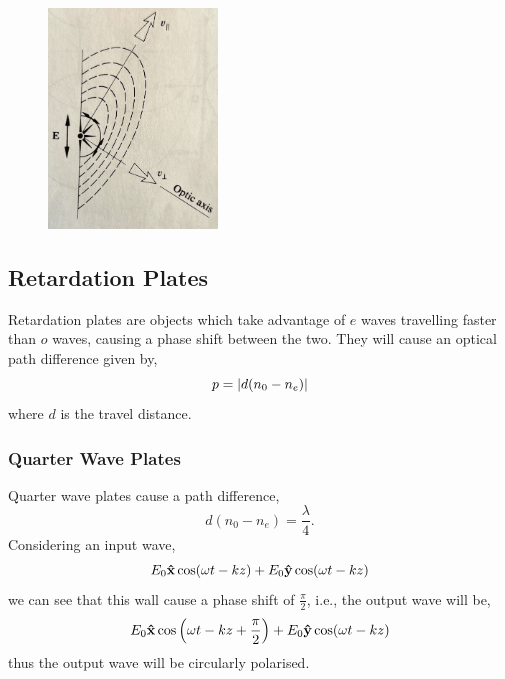\documentclass{book}
\begin{document}
{\begin{enumerate}
\begin{itemize}
\begin{itemize}
		\end{itemize}
	\end{itemize}
\end{enumerate}
\begin{figure}
	\centering
	\includegraphics[width=0.4\textwidth]{eo.png}
	\caption{}
	\label{fig:eo}
\end{figure}
\subsection{Retardation Plates}
Retardation plates are objects which take advantage of $e$ waves travelling faster than $o$ waves, causing a phase shift between the two. They will cause an optical path difference given by,
\begin{equation}
	p = \abs{d(n_0 - n_e)}
\end{equation}
where $d$ is the travel distance.
\subsubsection{Quarter Wave Plates}
Quarter wave plates cause a path difference,
\begin{equation}
	d(n_0 - n_e) = \frac{\lambda}{4}.
\end{equation}
Considering an input wave,
\begin{equation}
	E_0\vu{x}\cos(\omega t - kz) + E_0\vu{y}\cos(\omega t - kz)
\end{equation}
we can see that this wall cause a phase shift of $\frac{\pi}{2}$, i.e., the output wave will be,
\begin{equation}
	E_0\vu{x}\cos\left(\omega t - kz + \frac{\pi}{2}\right) + E_0\vu{y}\cos(\omega t - kz)
\end{equation}
thus the output wave will be circularly polarised.
}
\end{document}
